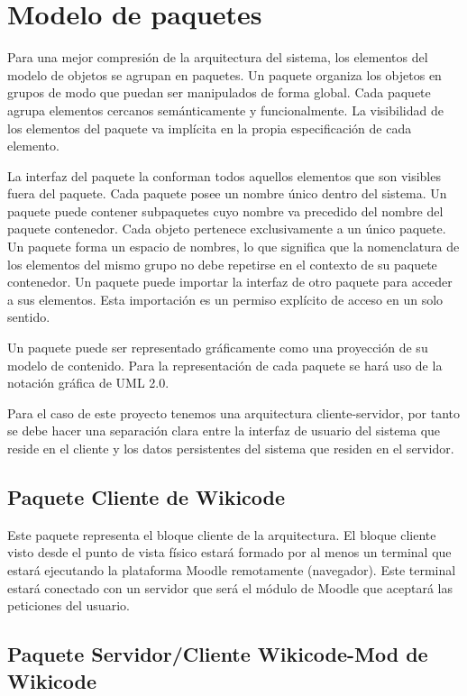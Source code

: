 \newpage

\section{Modelo de paquetes}

Para una mejor compresión de la arquitectura del sistema, los elementos del modelo de objetos se agrupan en paquetes. Un paquete organiza los objetos en grupos de modo que puedan ser manipulados de forma global. Cada paquete agrupa elementos cercanos semánticamente y funcionalmente. La visibilidad de los elementos del paquete va implícita en la propia especificación de cada elemento.

La interfaz del paquete la conforman todos aquellos elementos que son visibles fuera del paquete. Cada paquete posee un nombre único dentro del sistema. Un paquete puede contener subpaquetes cuyo nombre va precedido del nombre del paquete contenedor. Cada objeto pertenece exclusivamente a un único paquete. Un paquete forma un espacio de nombres, lo que significa que la nomenclatura de los elementos del mismo grupo no debe repetirse en el contexto de su paquete contenedor. Un paquete puede importar la interfaz de otro paquete para acceder a sus elementos. Esta importación es un permiso explícito de acceso en un solo sentido.

Un paquete puede ser representado gráficamente como una proyección de su modelo de contenido. Para la representación de cada paquete se hará uso de la notación gráfica de UML 2.0.

Para el caso de este proyecto tenemos una arquitectura cliente-servidor, por tanto se debe hacer una separación clara entre la interfaz de usuario del sistema que reside en el cliente y los datos persistentes del sistema que residen en el servidor.

\subsection{Paquete Cliente de Wikicode}

Este paquete representa el bloque cliente de la arquitectura. El bloque cliente visto desde el punto de vista físico estará formado por al menos un terminal que estará ejecutando la plataforma Moodle remotamente (navegador). Este terminal estará conectado con un servidor que será el módulo de Moodle que aceptará las peticiones del usuario.

\subsection{Paquete Servidor/Cliente Wikicode-Mod de Wikicode}

